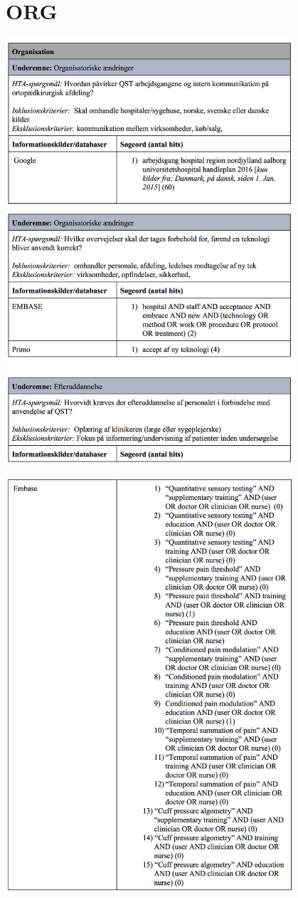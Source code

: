 \section{ORG}\label{ORG_sog}
\includegraphics[width=0.8\textwidth]{rapportAfsnit/qBilag/sogninger/ORG1}

\includegraphics[width=0.8\textwidth]{rapportAfsnit/qBilag/sogninger/ORG2}

